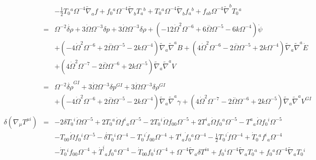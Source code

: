 \documentclass[10pt,letterpaper]{article}
\numberwithin{equation}{section}
\begin{document}
\begin{eqnarray}
&& -  \tfrac{1}{2} T_{0}{}^{a} \Omega^{-4} \tilde{\nabla}_{a}f + f_{0}{}^{a} \Omega^{-4} \tilde{\nabla}_{b}T_{a}{}^{b} + T_{0}{}^{a} \Omega^{-4} \tilde{\nabla}_{b}f_{a}{}^{b} + f_{ab} \Omega^{-4} \tilde{\nabla}^{b}T_{0}{}^{a}
\\ \nonumber\\
&=& \Omega^{-2} \dot{\delta \rho} + 3 \dot{\Omega} \Omega^{-3} \delta p + 3 \dot{\Omega} \Omega^{-3} \delta \rho + (-12 \dot{\Omega}^2 \Omega^{-6} + 6 \overset{..}{\Omega} \Omega^{-5} - 6 k \Omega^{-4}) \dot{\psi} \nonumber \\ 
&& + (-4 \dot{\Omega}^2 \Omega^{-6} + 2 \overset{..}{\Omega} \Omega^{-5} - 2 k \Omega^{-4}) \tilde{\nabla}_{a}\tilde{\nabla}^{a}B + (4 \dot{\Omega}^2 \Omega^{-6} - 2 \overset{..}{\Omega} \Omega^{-5} + 2 k \Omega^{-4}) \tilde{\nabla}_{a}\tilde{\nabla}^{a}\dot{E} \nonumber \\ 
&& + (4 \dot{\Omega}^2 \Omega^{-7} - 2 \overset{..}{\Omega} \Omega^{-6} + 2 k \Omega^{-5}) \tilde{\nabla}_{a}\tilde{\nabla}^{a}V
\\  \nonumber\\ 
&=& \Omega^{-2} \dot{\delta \rho}^{GI}{} + 3 \dot{\Omega} \Omega^{-3} \delta p^{GI}{} + 3 \dot{\Omega} \Omega^{-3} \delta \rho^{GI}{} \nonumber \\ 
&& + (-4 \dot{\Omega}^2 \Omega^{-6} + 2 \overset{..}{\Omega} \Omega^{-5} - 2 k \Omega^{-4}) \tilde{\nabla}_{a}\tilde{\nabla}^{a}\gamma +(4 \dot{\Omega}^2 \Omega^{-7} - 2 \overset{..}{\Omega} \Omega^{-6} + 2 k \Omega^{-5}) \tilde{\nabla}_{a}\tilde{\nabla}^{a}V^{GI}{}
\\ \nonumber\\
\delta(\nabla_\mu T^{\mu i})&=& -2 \delta T_{0}{}^{i} \dot{\Omega} \Omega^{-5} + 2 T_{0}{}^{a} \dot{\Omega} f^{i}{}_{a} \Omega^{-5} - 2 T_{0}{}^{i} \dot{\Omega} f_{00}{} \Omega^{-5} + 2 T^{i}{}_{a} \dot{\Omega} f_{0}{}^{a} \Omega^{-5} -  T^{a}{}_{a} \dot{\Omega} f_{0}{}^{i} \Omega^{-5} \nonumber \\ 
&& -  T_{00}{} \dot{\Omega} f_{0}{}^{i} \Omega^{-5} -  \dot{\delta T}_{0}{}^{i} \Omega^{-4} -  T_{0}{}^{i} \dot{f}_{00}{} \Omega^{-4} + T^{i}{}_{a} \dot{f}_{0}{}^{a} \Omega^{-4} -  \tfrac{1}{2} T_{0}{}^{i} \dot{f} \Omega^{-4} + \dot{T}_{0}{}^{a} f^{i}{}_{a} \Omega^{-4} \nonumber \\ 
&& -  \dot{T}_{0}{}^{i} f_{00}{} \Omega^{-4} + \dot{T}^{i}{}_{a} f_{0}{}^{a} \Omega^{-4} -  \dot{T}_{00}{} f_{0}{}^{i} \Omega^{-4} + \Omega^{-4} \tilde{\nabla}_{a}\delta T^{ia} + f_{0}{}^{i} \Omega^{-4} \tilde{\nabla}_{a}T_{0}{}^{a} + f_{0}{}^{a} \Omega^{-4} \tilde{\nabla}_{a}T_{0}{}^{i} \nonumber \\ 

\end{eqnarray}
\end{document}
